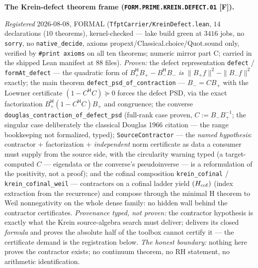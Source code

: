 \documentclass[11pt,a4paper]{article}
\begin{document}
\par\smallskip\noindent\textbf{The Krein-defect theorem frame
(\texttt{FORM.PRIME.\allowbreak KREIN.\allowbreak DEFECT.01}
[F]).}
{\sloppy
\emph{Registered} 2026-08-08, FORMAL
(\texttt{TfptCarrier/KreinDefect.lean}, $14$ declarations ($10$
theorems), kernel-checked --- lake build green at $3416$ jobs,
no \texttt{sorry}, no \texttt{native\_decide}, axioms
propext/Classical.choice/Quot.sound only, verified by
\texttt{\#print axioms} on all ten theorems; numeric mirror
 part C; carried in the
shipped Lean manifest at $88$ files).  \emph{Proven:} the
defect representation \texttt{defect} / \texttt{formAt\_defect}
--- the quadratic form of $B_+^{\mathsf H}B_+ -
B_-^{\mathsf H}B_-$ \emph{is} $\|B_+f\|^2 - \|B_-f\|^2$
exactly; the main theorem \texttt{defect\_psd\_of\_contraction}
--- $B_- = CB_+$ with the Loewner certificate $(1 -
C^{\mathsf H}C) \succeq 0$ forces the defect PSD, via the exact
factorization $B_+^{\mathsf H}(1 - C^{\mathsf H}C)B_+$ and
congruence; the converse
\texttt{douglas\_contraction\_of\_defect\_psd} (full-rank case
proven, $C := B_-B_+^{-1}$; the singular case deliberately the
classical Douglas 1966 citation --- the range bookkeeping not
formalized, typed); \texttt{SourceContractor} --- the
\emph{named hypothesis}: contractor $+$ factorization $+$
\emph{independent} norm certificate as data a consumer must
supply from the source side, with the circularity warning typed
(a target-computed $C$ --- eigendata or the converse's
pseudoinverse --- is a reformulation of the positivity, not a
proof); and the cofinal composition \texttt{krein\_cofinal} /
\texttt{krein\_cofinal\_weil} --- contractors on a cofinal
ladder yield $(H_{\rm cof})$ (index extraction from the
recurrence) and compose through the minimal H theorem to Weil
nonnegativity on the whole dense family: no hidden wall behind
the contractor certificates.  \emph{Provenance typed, not
proven:} the contractor hypothesis is exactly what the Krein
source-algebra search must deliver;
 delivers its closed
\emph{formula} and proves the absolute half of the toolbox
cannot certify it --- the certificate demand is the
registration below.  \emph{The honest boundary:} nothing here
proves the contractor exists; no continuum theorem, no RH
statement, no arithmetic identification.\par}
\end{document}
